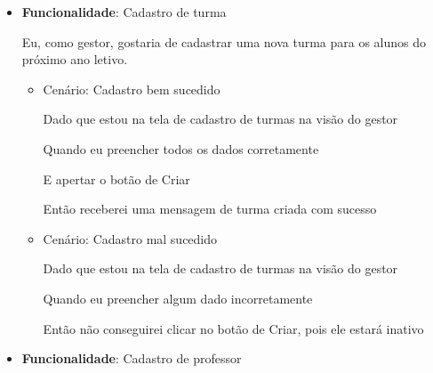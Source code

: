 \begin{itemize}
\item\textbf{Funcionalidade}: Cadastro de turma
    
    Eu, como gestor, gostaria de cadastrar uma nova turma para os alunos do próximo ano letivo.
    \begin{itemize}
        \item Cenário: Cadastro bem sucedido  
        \par Dado que estou na tela de cadastro de turmas na visão do gestor
        \par Quando eu preencher todos os dados corretamente
        \par E apertar o botão de Criar
        \par Então receberei uma mensagem de turma criada com sucesso
    \end{itemize}   
    \begin{itemize}
        \item Cenário: Cadastro mal sucedido  
        \par Dado que estou na tela de cadastro de turmas na visão do gestor
        \par Quando eu preencher algum dado incorretamente
        \par Então não conseguirei clicar no botão de Criar, pois ele estará inativo
    \end{itemize}   

\item\textbf{Funcionalidade}: Cadastro de professor
    

\end{itemize}
